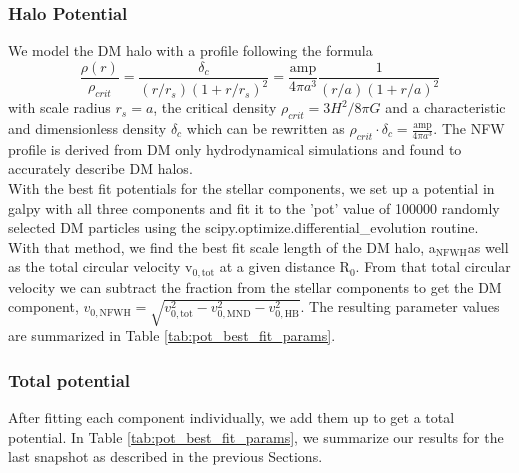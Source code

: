 \subsubsection{Halo Potential}\label{subsubsec:halo_pot}
We model the \ac{DM} halo with a \citet{NFWprofile} profile following the formula 
\begin{equation}
    \frac{\rho(r)}{\rho_{crit}} = \frac{\delta_c}{(r/r_s)(1+r/r_s)^2} = \frac{\mathrm{amp}}{4 \pi a^3}\frac{1}{(r/a)(1+r/a)^2}
\end{equation} with scale radius $r_s = a$, the critical density $\rho_{crit} = 3H^2 / 8\pi G $ and a characteristic and dimensionless density $\delta_c$ which can be rewritten as \(\rho_{crit}\cdot\delta_c = \frac{\mathrm{amp}}{4\pi a^3} \). The \ac{NFW} profile is derived from \ac{DM} only hydrodynamical simulations and found to accurately describe \ac{DM} halos. 
\\With the best fit potentials for the stellar components, we set up a potential in galpy with all three components and fit it to the 'pot' value of 100000 randomly selected DM particles using the scipy.optimize.differential\_evolution routine. With that method, we find the best fit scale length of the DM halo, a$_{\mathrm{NFWH}}$as well as the total circular velocity v$_{0,\mathrm{tot}}$ at a given distance R$_0$. From that total circular velocity we can subtract the fraction from the stellar components to get the \ac{DM} component, $v_{0,\mathrm{NFWH}} = \sqrt{v_{0,\mathrm{tot}}^2 - v_{0, \mathrm{MND}}^2 - v_{0, \mathrm{HB}}^2}$. The resulting parameter values are summarized in Table \ref{tab:pot_best_fit_params}. 

\subsubsection{Total potential}\label{subsubsec:tot_pot}
After fitting each component individually, we add them up to get a total potential. In Table \ref{tab:pot_best_fit_params}, we summarize our results for the last snapshot as described in the previous Sections. 

